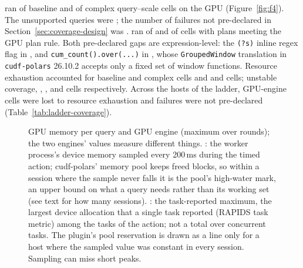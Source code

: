 \documentclass[11pt]{article}
\begin{document}
\polarsgpu{} ran  of
 baseline and
 of
 complex query--scale cells on the GPU
(Figure~\ref{fig:f4}). The unsupported queries were
; the number of failures not
pre-declared in Section~\ref{sec:coverage-design} was
. \sparkgpu{} ran
 of
 and
 of
 cells with plans meeting the GPU plan
rule. Both pre-declared \polarsgpu{} gaps are expression-level: the
\texttt{(?s)} inline regex flag in , and
\texttt{cum\_count().over(...)} in , whose
\texttt{GroupedWindow} translation in \texttt{cudf-polars} 26.10.2 accepts only
a fixed set of window functions. Resource exhaustion accounted for
 baseline and
 complex \polarsgpu{}
cells and  and
 \sparkgpu{} cells;
unstable coverage, ,
,
 and
 cells respectively. Across the
 hosts of the ladder, 
GPU-engine cells were lost to resource exhaustion and
 \polarsgpu{} failures were not
pre-declared (Table~\ref{tab:ladder-coverage}).

\begin{figure}[t]
\centering
{}
\caption{GPU memory per query and GPU engine (maximum over rounds); the two
engines' values measure different things. \polarsgpu{}: the worker process's
device memory sampled every 200\,ms during the timed action; cudf-polars'
memory pool keeps freed blocks, so within a session where the sample never
falls it is the pool's high-water mark, an upper bound on what a query needs
rather than its working set (see text for how many sessions). \sparkgpu{}: the
task-reported maximum, the largest device allocation that a single task
reported (RAPIDS task metric) among the tasks of the action; not a total over
concurrent tasks. The plugin's pool reservation is drawn as a line only for a
host where the sampled value was constant in every session. Sampling can miss
short peaks.}
\label{fig:f7}
\end{figure}
\end{document}
